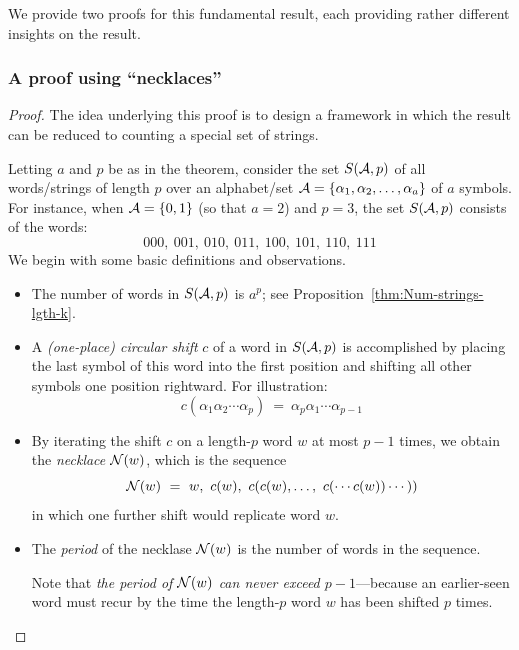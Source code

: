 %

\noindent
We provide two proofs for this fundamental result, each providing
rather different insights on the result.


\subsubsection{A proof using ``necklaces''}
\label{sec:FTL-necklaces}

\begin{proof}
The idea underlying this proof is to design a framework in which the
result can be reduced to counting a special set of strings.

Letting $a$ and $p$ be as in the theorem, consider the set $S(\mbox{$\cal A$},p)$ of
all words/strings of length $p$ over an alphabet/set $\mbox{$\cal A$} = \{ \alpha_1,
\alpha_2, \ldots, \alpha_a \}$ of $a$ symbols.  For instance, when $\mbox{$\cal A$}
= \{0,1\}$ (so that $a=2$) and $p=3$, the set $S(\mbox{$\cal A$},p)$ consists of the
words:
\[ 000, \ 001, \ 010, \ 011, \ 100, \ 101, \ 110, \ 111 \]
We begin with some basic definitions and observations.
\begin{itemize}
\item
The number of words in $S(\mbox{$\cal A$},p)$ is $a^p$; see
Proposition~\ref{thm:Num-strings-lgth-k}.

\item
A {\it (one-place) circular shift} $c$ of a word in $S(\mbox{$\cal A$},p)$ is
accomplished by placing the last symbol of this word into the first
position and shifting all other symbols one position rightward.  For
illustration:
\[ c(\alpha_1 \alpha_2 \cdots \alpha_p) \ = \ \alpha_p \alpha_1 \cdots
\alpha_{p-1} \]

\item
By iterating the shift $c$ on a length-$p$ word $w$ at most $p-1$
times, we obtain the {\it necklace} $\mbox{$\cal N$}(w)$, which is the sequence
\[ \n(w) \ = \ w, \ c(w), \ c(c(w), \ldots, \ c(\cdots c(w)) \cdots )) \]
in which one further shift would replicate word $w$.

\item
The {\it period} of the necklase $\mbox{$\cal N$}(w)$ is the number of words in the
sequence.

Note that {\em the period of $\mbox{$\cal N$}(w)$ can never exceed $p-1$}---because
an earlier-seen word must recur by the time the length-$p$ word $w$
has been shifted $p$ times.
\end{itemize}


\end{proof}
